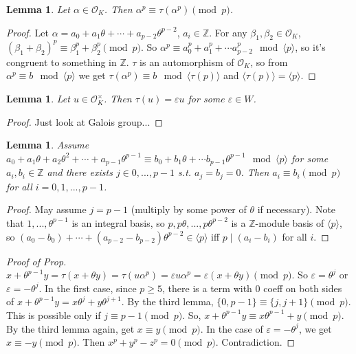 \documentclass{article}
\theoremstyle{definition}
\theoremstyle{remark}
\theoremstyle{plain}
\newtheorem{lem}[defn]{Lemma}
\newcommand{\ZZ}{\mathbb{Z}}
\newcommand{\e}{\varepsilon}
\begin{document}
\begin{lem}
    Let $\alpha\in\mathcal O_K$. Then $\alpha^p\equiv \tau(\alpha^p)\pmod p$.
\end{lem}
\begin{proof}
    Let $\alpha=a_0+a_1\theta+\cdots+a_{p-2}\theta^{p-2}$, $a_i\in\ZZ$. For any $\beta_1,\beta_2\in\mathcal O_K$, $(\beta_1+\beta_2)^p\equiv \beta_1^p+\beta_2^p\pmod p$. So $\alpha^p\equiv a_0^p+a_1^p+\cdots a_{p-2}^p\mod\langle p\rangle$, so it's congruent to something in $\ZZ$. $\tau$ is an automorphism of $\mathcal O_K$, so from $\alpha^p\equiv b\mod \langle p\rangle$ we get $\tau(\alpha^p)\equiv b\mod\langle\tau(p)\rangle$ and $\langle\tau(p)\rangle=\langle p\rangle$.
\end{proof}
\begin{lem}
    Let $u\in\mathcal O_K^\times$. Then $\tau(u)=\e u$ for some $\e\in W$.
\end{lem}
\begin{proof}
    Just look at Galois group...
\end{proof}
\begin{lem}
    Assume $a_0+a_1\theta+a_2\theta^2+\cdots+a_{p-1}\theta^{p-1}\equiv b_0+b_1\theta+\cdots b_{p-1}\theta^{p-1}\mod\langle p\rangle$ for some $a_i,b_i\in\ZZ$ and there exists $j\in{0,...,p-1}$ s.t. $a_j=b_j=0$. Then $a_i\equiv b_i\pmod p$ for all $i=0,1,...,p-1$.
\end{lem}
\begin{proof}
    May assume $j=p-1$ (multiply by some power of $\theta$ if necessary). Note that $1,...,\theta^{p-1}$ is an integral basis, so $p,p\theta,...,p\theta^{p-2}$ is a $\ZZ$-module basis of $\langle p\rangle$, so $(a_0-b_0)+\cdots+(a_{p-2}-b_{p-2})\theta^{p-2}\in\langle p\rangle$ iff $p\mid (a_i-b_i)$ for all $i$.
\end{proof}
\begin{proof}[Proof of Prop]
    $x+\theta^{p-1}y=\tau(x+\theta y)=\tau(u\alpha^p)=\e u\alpha^p=\e(x+\theta y)\pmod p$. So $\e=\theta^j$ or $\e=-\theta^j$. In the first case, since $p\ge 5$, there is a term with $0$ coeff on both sides of $x+\theta^{p-1}y=x\theta^j+y\theta^{j+1}$. By the third lemma, $\{0,p-1\}\equiv \{j,j+1\}\pmod p$. This is possible only if $j\equiv  p-1\pmod p$. So, $x+\theta^{p-1}y\equiv x\theta^{p-1}+y\pmod p$. By the third lemma again, get $x\equiv y\pmod p$. In the case of $\e=-\theta^j$, we get $x\equiv -y\pmod p$. Then $x^p+y^p-z^p=0\pmod p$. Contradiction.
\end{proof}
\end{document}
